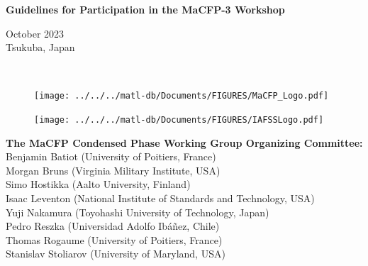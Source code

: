 \documentclass[12pt]{article}
\begin{document}

\thispagestyle{empty}


\vspace*{0.75in}

\begin{center}
\begin{Large}
{\bf Guidelines for Participation in the MaCFP-3 Workshop} \\
\end{Large}
\begin{large}
October 2023\\
Tsukuba, Japan
\end{large}
\hspace{1in} \\
\end{center}


\begin{figure}[h]
  \centering
  \texttt{[image: ../../../matl-db/Documents/FIGURES/MaCFP\_Logo.pdf]}
  \label{Cover_Image}
\end{figure}

\vfill

\begin{minipage}{0.25\textwidth}
\begin{figure}[H]
\texttt{[image: ../../../matl-db/Documents/FIGURES/IAFSSLogo.pdf]}
\end{figure}
\end{minipage} \hfill
\begin{minipage}{0.75\textwidth}
\begin{flushright}
\begin{small}
{\bf The MaCFP Condensed Phase Working Group Organizing Committee:} \\
Benjamin Batiot (University of Poitiers, France) \\
Morgan Bruns (Virginia Military Institute, USA) \\
Simo Hostikka (Aalto University, Finland) \\
Isaac Leventon (National Institute of Standards and Technology, USA) \\
Yuji Nakamura (Toyohashi University of Technology, Japan) \\
Pedro Reszka (Universidad Adolfo Ibáñez, Chile) \\
Thomas Rogaume (University of Poitiers, France) \\
Stanislav Stoliarov (University of Maryland, USA)
\end{small}
\end{flushright}
\end{minipage}
\end{document}
